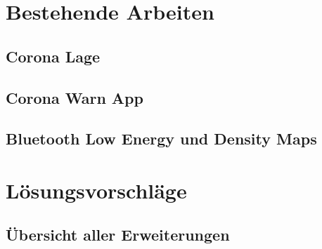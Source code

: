 \documentclass[conference]{IEEEtran}
\begin{document}
\section{Bestehende Arbeiten}

\subsection{Corona Lage}
\subsection{Corona Warn App}
\subsection{Bluetooth Low Energy und Density Maps}

\section{Lösungsvorschläge}


\subsection{Übersicht aller Erweiterungen}
\end{document}
